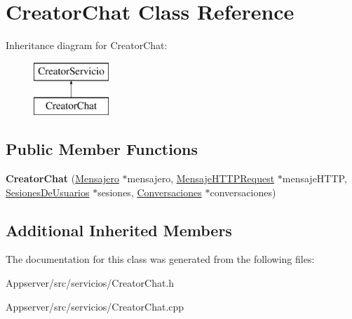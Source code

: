 \hypertarget{classCreatorChat}{}\section{Creator\+Chat Class Reference}
\label{classCreatorChat}
Inheritance diagram for Creator\+Chat\+:\begin{figure}[H]
\begin{center}
\leavevmode
\includegraphics[height=2.000000cm]{classCreatorChat}
\end{center}
\end{figure}
\subsection*{Public Member Functions}
\begin{DoxyCompactItemize}
\item 
{\bfseries Creator\+Chat} (\hyperlink{classMensajero}{Mensajero} $\ast$mensajero, \hyperlink{classMensajeHTTPRequest}{Mensaje\+H\+T\+T\+P\+Request} $\ast$mensaje\+H\+T\+TP, \hyperlink{classSesionesDeUsuarios}{Sesiones\+De\+Usuarios} $\ast$sesiones, \hyperlink{classConversaciones}{Conversaciones} $\ast$conversaciones)\hypertarget{classCreatorChat_a07a803e2f80c4a9e4103ae8e2b56daaa}{}\label{classCreatorChat_a07a803e2f80c4a9e4103ae8e2b56daaa}

\end{DoxyCompactItemize}
\subsection*{Additional Inherited Members}


The documentation for this class was generated from the following files\+:\begin{DoxyCompactItemize}
\item 
Appserver/src/servicios/Creator\+Chat.\+h\item 
Appserver/src/servicios/Creator\+Chat.\+cpp\end{DoxyCompactItemize}

